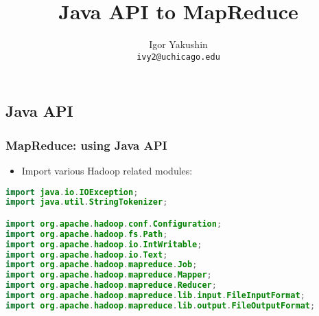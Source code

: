 \documentclass{beamer}
\title{\huge{Java API to MapReduce}}
\author{Igor Yakushin \\ \texttt{ivy2@uchicago.edu}}
\date{}
\begin{document}



\begin{frame}
\titlepage
\end{frame}




\subsection{Java API}
\begin{frame}[fragile]
 \frametitle{MapReduce: using Java API}

\begin{itemize}
\item Import various Hadoop related modules:
\end{itemize}
{\color{mycolorcode}
  \begin{lstlisting}[frame=single, basicstyle=\tiny,language=java]
import java.io.IOException;
import java.util.StringTokenizer;

import org.apache.hadoop.conf.Configuration;
import org.apache.hadoop.fs.Path;
import org.apache.hadoop.io.IntWritable;
import org.apache.hadoop.io.Text;
import org.apache.hadoop.mapreduce.Job;
import org.apache.hadoop.mapreduce.Mapper;
import org.apache.hadoop.mapreduce.Reducer;
import org.apache.hadoop.mapreduce.lib.input.FileInputFormat;
import org.apache.hadoop.mapreduce.lib.output.FileOutputFormat;
  \end{lstlisting}
}
\end{frame}
\end{document}
